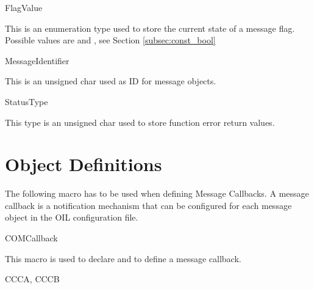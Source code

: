 \begin{type}{FlagValue}
  \begin{typedescription}
    This is an enumeration type used to store the current state of a message flag.
    Possible values are  and , see 
    Section \ref{subsec:const_bool}
  \end{typedescription}
\end{type}

\begin{type}{MessageIdentifier}
  \begin{typedescription}
    This is an unsigned char used as ID for message objects.
  \end{typedescription}
\end{type}

\begin{type}{StatusType}
  \begin{typedescription}
    This type is an unsigned char used to store function error return values.
  \end{typedescription}
\end{type}


\pagebreak


\section{Object Definitions}
The following macro has to be used when defining Message Callbacks. A message
callback is a notification mechanism that can be configured for each message 
object in the OIL configuration file.

\begin{function_nopb}{COMCallback}
  \begin{fundescription}
    This macro is used to declare and to define a message callback.
  \end{fundescription}
  \begin{funparameters}
  \end{funparameters}
  \begin{funconformance}
    CCCA, CCCB
  \end{funconformance}
\end{function_nopb}






